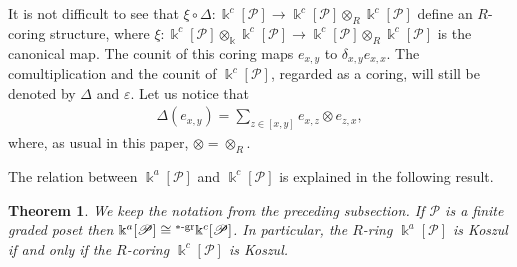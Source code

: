 \documentclass[pdftex]{sigma}
\newcommand\ot{\otimes}
\newcommand\kal{\mathscr}
\renewcommand{\^}[1]{\mbox{$^{\left( #1 \right)}$}}
\renewcommand{\_}[1]{\mbox{$_{\left( #1 \right)}$}}
\newcommand{\de}{\delta}
\numberwithin{equation}{section}
\newtheorem{Theorem}{Theorem}[section]
\begin{document}
It is not dif\/f\/icult to see that $\xi\circ \Delta\colon \Bbbk^c[\kal{P}]\to \Bbbk^c[\kal{P}]\ot_R \Bbbk^c[\kal{P}]$ def\/ine an $R$-coring structure, where $\xi\colon \Bbbk^c[\kal{P}]\ot_\Bbbk \Bbbk^c[\kal{P}]\to \Bbbk^c[\kal{P}]\ot_R \Bbbk^c[\kal{P}]$ is the canonical map. The counit of this coring maps $e_{x,y}$ to $\de_{x,y}e_{x,x}$. The comultiplication and the counit of $\Bbbk^c[\kal{P}]$, regarded as a coring, will still be denoted by $\Delta$ and $\varepsilon$. Let us notice that
\begin{gather*}
\Delta(e_{x,y}) = \sum_{z \in [x,y]} e_{x,z} \ot e_{z,x},
\end{gather*}
where, as usual in this paper, $\ot=\ot_R$.

The relation between $\Bbbk^a[\kal{P}]$ and $\Bbbk^c[\kal{P}]$ is explained in the following result.

\begin{Theorem}\label{te:incidence-path}
We keep the notation from the preceding subsection. If $\kal{P}$ is a finite graded poset then $\Bbbk^a[\kal{P}]\cong {}^{*\text{\rm -gr}} \Bbbk^c[\kal{P}]$. In particular, the $R$-ring $\Bbbk^a[\kal{P}]$ is Koszul if and only if the $R$-coring $\Bbbk^c[\kal{P}] $ is Koszul.
\end{Theorem}
\end{document}
